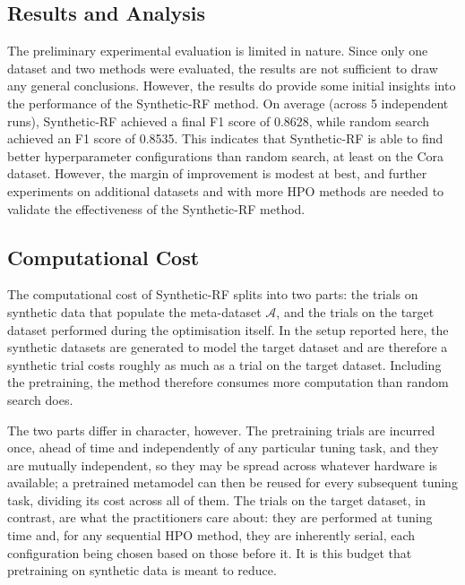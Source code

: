 \subsection{Results and Analysis}

The preliminary experimental evaluation is limited in nature. Since only one dataset and two methods were evaluated, the results are not sufficient to draw any general conclusions. However, the results do provide some initial insights into the performance of the Synthetic-RF method. On average (across 5 independent runs), Synthetic-RF achieved a final F1 score of 0.8628, while random search achieved an F1 score of 0.8535. This indicates that Synthetic-RF is able to find better hyperparameter configurations than random search, at least on the Cora dataset. However, the margin of improvement is modest at best, and further experiments on additional datasets and with more HPO methods are needed to validate the effectiveness of the Synthetic-RF method.

\subsection{Computational Cost}

The computational cost of Synthetic-RF splits into two parts: the trials on synthetic data that populate the meta-dataset \( \mathcal{A} \), and the trials on the target dataset performed during the optimisation itself. In the setup reported here, the synthetic datasets are generated to model the target dataset and are therefore a synthetic trial costs roughly as much as a trial on the target dataset. Including the pretraining, the method therefore consumes more computation than random search does.

The two parts differ in character, however. The pretraining trials are incurred once, ahead of time and independently of any particular tuning task, and they are mutually independent, so they may be spread across whatever hardware is available; a pretrained metamodel can then be reused for every subsequent tuning task, dividing its cost across all of them. The trials on the target dataset, in contrast, are what the practitioners care about: they are performed at tuning time and, for any sequential HPO method, they are inherently serial, each configuration being chosen based on those before it. It is this budget that pretraining on synthetic data is meant to reduce.
